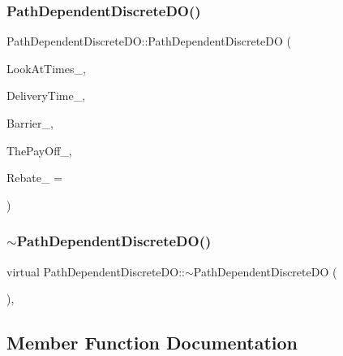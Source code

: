 \subsubsection{\texorpdfstring{Path\+Dependent\+Discrete\+D\+O()}{PathDependentDiscreteDO()}}
{\footnotesize\ttfamily Path\+Dependent\+Discrete\+D\+O\+::\+Path\+Dependent\+Discrete\+DO (\begin{DoxyParamCaption}\item[{const \hyperlink{classMJArray}{M\+J\+Array} \&}]{Look\+At\+Times\+\_\+,  }\item[{double}]{Delivery\+Time\+\_\+,  }\item[{double}]{Barrier\+\_\+,  }\item[{const \hyperlink{classPayOffBridge}{Pay\+Off\+Bridge} \&}]{The\+Pay\+Off\+\_\+,  }\item[{double}]{Rebate\+\_\+ = {} }\end{DoxyParamCaption})}

\hypertarget{classPathDependentDiscreteDO_a3da858fb81986c7a34c04479c631532b}{}\label{classPathDependentDiscreteDO_a3da858fb81986c7a34c04479c631532b} 
\subsubsection{\texorpdfstring{$\sim$\+Path\+Dependent\+Discrete\+D\+O()}{~PathDependentDiscreteDO()}}
{\footnotesize\ttfamily virtual Path\+Dependent\+Discrete\+D\+O\+::$\sim$\+Path\+Dependent\+Discrete\+DO (\begin{DoxyParamCaption}{ }\end{DoxyParamCaption})\hspace{0.3cm}{\ttfamily [inline]}, {\ttfamily [virtual]}}



\subsection{Member Function Documentation}
\hypertarget{classPathDependentDiscreteDO_aaf15433cd3271c6af5cacf91ac154811}{}\label{classPathDependentDiscreteDO_aaf15433cd3271c6af5cacf91ac154811} 
